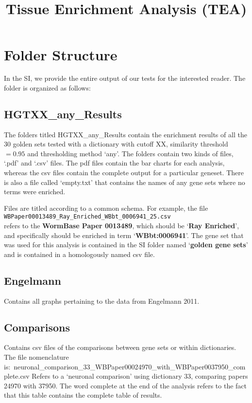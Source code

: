 \documentclass{article}
\begin{document}

\title{Tissue Enrichment Analysis (TEA)}


\section*{Folder Structure}

In the SI, we provide the entire output of our tests for the interested reader. The folder is organized as follows:

\subsection*{HGTXX\_any\_Results}
The folders titled HGTXX\_any\_Results contain the enrichment results of all the 30 golden sets tested with a dictionary with cutoff XX, similarity threshold $=0.95$ and thresholding method `any'. The folders contain two kinds of files, `.pdf' and `.csv' files. The pdf files contain the bar charts for each analysis, whereas the csv files contain the complete output for a particular geneset. There is also a file called `empty.txt' that contains the names of any gene sets where no terms were enriched.

Files are titled according to a common schema. For example, the file \\
\texttt{WBPaper00013489\_Ray\_Enriched\_WBbt\_0006941\_25.csv}\\
refers to the \textbf{WormBase Paper 0013489}, which should be `\textbf{Ray Enriched}', and specifically should be enriched in term `\textbf{WBbt:0006941}'. The gene set that was used for this analysis is contained in the SI folder named `\textbf{golden gene sets}' and is contained in a homologously named csv file. 

\subsection*{Engelmann}
	Contains all graphs pertaining to the data from Engelmann 2011. 

\subsection*{Comparisons}
	Contains csv files of the comparisons between gene sets or within dictionaries. The file nomenclature is:\
neuronal\_comparison\_33\_WBPaper00024970\_with\_WBPaper0037950\_complete.csv
Refers to a `neuronal comparison' using dictionary 33, comparing papers 24970 with 37950. The word complete at the end of the analysis refers to the fact that this table contains the complete table of results. 
\end{document}
